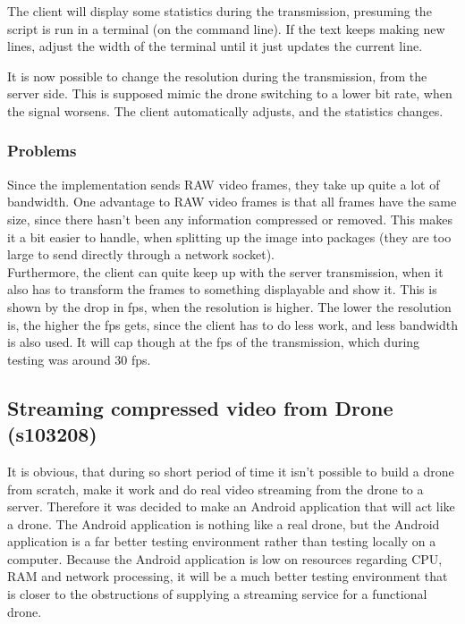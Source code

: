 The client will display some statistics during the transmission, presuming the script is run in a terminal (on the command line). If the text keeps making new lines, adjust the width of the terminal until it just updates the current line.

It is now possible to change the resolution during the transmission, from the server side. This is supposed mimic the drone switching to a lower bit rate, when the signal worsens. The client automatically adjusts, and the statistics changes.\\


\subsubsection{Problems}
Since the implementation sends RAW video frames, they take up quite a lot of bandwidth. One advantage to RAW video frames is that all frames have the same size, since there hasn't been any information compressed or removed. This makes it a bit easier to handle, when splitting up the image into packages (they are too large to send directly through a network socket).\\

Furthermore, the client can quite keep up with the server transmission, when it also has to transform the frames to something displayable and show it. This is shown by the drop in fps, when the resolution is higher. The lower the resolution is, the higher the fps gets, since the client has to do less work, and less bandwidth is also used. It will cap though at the fps of the transmission, which during testing was around 30 fps.

\subsection{Streaming compressed video from Drone (s103208)}
It is obvious, that during so short period of time it isn't possible to build a drone from scratch, make it work and do real video streaming from the drone to a server. Therefore it was decided to make an Android application that will act like a drone. The Android application is nothing like a real drone, but the Android application is a far better testing environment rather than testing locally on a computer. Because the Android application is low on resources regarding CPU, RAM and network processing, it will be a much better testing environment that is closer to the obstructions of supplying a streaming service for a functional drone.

